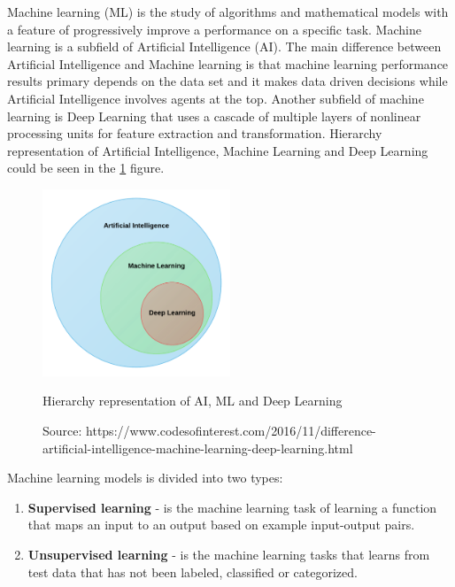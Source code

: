 Machine learning (ML) is the study of algorithms and mathematical models with a feature of progressively improve a performance on a specific task. Machine learning is a subfield of Artificial Intelligence (AI). The main difference between Artificial Intelligence and Machine learning is that machine learning performance results primary depends on the data set and it makes data driven decisions while Artificial Intelligence involves agents at the top. Another subfield of machine learning is Deep Learning that uses a cascade of multiple layers of nonlinear processing units for feature extraction and transformation. Hierarchy representation of Artificial Intelligence, Machine Learning and Deep Learning could be seen in the \ref{fig:ml_hierarchy} figure.

\begin{figure}[H]
\centering
\includegraphics[width=0.5\textwidth]{Pictures/ml_hierarchy.png}
\caption{\label{fig:ml_hierarchy}{}Hierarchy representation of AI, ML and Deep Learning}
\caption*{Source: https://www.codesofinterest.com/2016/11/difference-artificial-intelligence-machine-learning-deep-learning.html}
\end{figure}


Machine learning models is divided into two types:

\begin{enumerate}
    \item \textbf{Supervised learning} - is the machine learning task of learning a function that maps an input to an output based on example input-output pairs.
    \item \textbf{Unsupervised learning} - is the machine learning tasks that learns from test data that has not been labeled, classified or categorized.
\end{enumerate}




